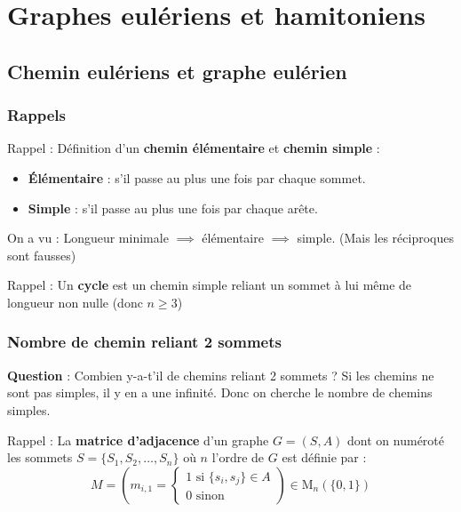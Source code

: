 
\chapter{Graphes eulériens et hamitoniens} %
\label{chap:Graphes eulériens et hamitoniens}


\section{Chemin eulériens et graphe eulérien} %
\label{sec:Chemin eulériens et graphe eulérien}


\subsection{Rappels} %

Rappel : Définition d'un \textbf{chemin élémentaire} et \textbf{chemin simple} : 
\begin{itemize}

  \item \textbf{Élémentaire} : s'il passe au plus une fois par chaque sommet. 

  \item \textbf{Simple} : s'il passe au plus une fois par chaque arête.

\end{itemize}


On a vu : Longueur minimale $\implies$ élémentaire $\implies$ simple. (Mais les réciproques sont fausses)

Rappel : Un \textbf{cycle} est un chemin simple reliant un sommet à lui même de longueur non nulle (donc $n \ge 3$)

\subsection{Nombre de chemin reliant 2 sommets} %
\label{sub:Nombre de chemin reliant 2 sommets}

\textbf{Question} : Combien y-a-t'il de chemins reliant 2 sommets ? Si les chemins ne sont pas simples, il y en a une infinité. Donc on cherche le nombre de chemins simples. 



Rappel : La \textbf{matrice d'adjacence} d'un graphe $G = (S, A)$ dont on numéroté les sommets $S = \{S_1, S_2, \dots, S_n \}$ où $n$ l'ordre de $G$ est définie par : 
\begin{equation}
  M = \left( m _{i,1} = \begin{cases}
      1 \text{ si } \{ s_i, s_j \} \in A \\ 
      0 \text{ sinon}
  \end{cases} \right)  \in \mathrm{M} _n (\{0, 1\})
\end{equation}

